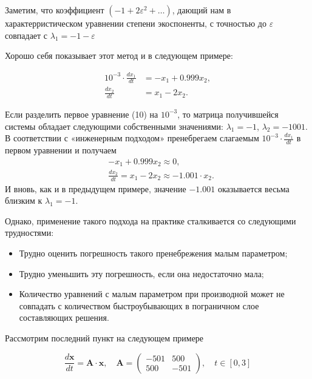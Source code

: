 	Заметим, что коэффициент $(-1 + 2\varepsilon^2 + \dots)$, дающий нам в характерристическом уравнении степени экоспоненты, с точностью до $\varepsilon$ совпадает с $\lambda_1 = - 1 - \varepsilon$
	
	\vspace{1em}
	
	Хорошо себя показывает этот метод и в следующем примере:
	
	\vspace{-0.85em}
	
	\begin{align}
		10^{-3} \cdot \frac{dx_1}{dt} &= -x_1 + 0.999x_2, \\
		\frac{dx_2}{dt} &= x_1 - 2x_2 \tag{10}.
	\end{align}
	
	Если разделить первое уравнение (10) на $10^{-3}$, то матрица получившейся системы обладает следующими собственными значениями: $\lambda_1 = -1$, $\lambda_2 = -1001$. В соответствии с «инженерным подходом» пренебрегаем слагаемым $10^{-3} \cdot \frac{dx_1}{dt}$ в первом уравнении и получаем
	\begin{align*}
		& -x_1 + 0.999x_2 \approx 0, \\
		& \frac{dx_2}{dt} = x_1 - 2x_2 \approx -1.001 \cdot x_2.
	\end{align*}
	И вновь, как и в предыдущем примере, значение $-1.001$ оказывается весьма близким к $\lambda_1 = -1$.
	
	Однако, применение такого подхода на практике сталкивается со следующими трудностями:
	
	\begin{itemize}
		\item Трудно оценить погрешность такого пренебрежения малым параметром;
		\item Трудно уменьшить эту погрешность, если она недостаточно мала;
		\item Количество уравнений с малым параметром при производной может не совпадать с количеством быстроубывающих в пограничном слое составляющих решения.
	\end{itemize}
	
	\newpage
	
	Рассмотрим последний пункт на следующем примере
	
	\begin{equation}
		\frac{d\mathbf{x}}{dt} = \mathbf{A} \cdot \mathbf{x}, \quad 
		\mathbf{A} = \begin{pmatrix}
			-501 & 500 \\
			500 & -501
		\end{pmatrix}, \quad t \in [0, 3]
		\label{eq:leaving_derivatives_bad_example}
	\end{equation}
	
